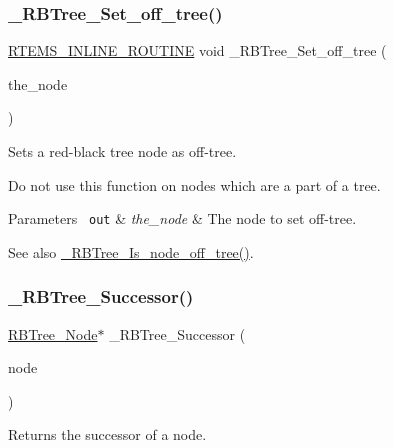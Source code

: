 \subsubsection{\texorpdfstring{\_RBTree\_Set\_off\_tree()}{\_RBTree\_Set\_off\_tree()}}
{\footnotesize\ttfamily \mbox{\hyperlink{group__RTEMSScoreBaseDefs_gac216239df231d5dbd15e3520b0b9313f}{R\+T\+E\+M\+S\+\_\+\+I\+N\+L\+I\+N\+E\+\_\+\+R\+O\+U\+T\+I\+NE}} void \+\_\+\+R\+B\+Tree\+\_\+\+Set\+\_\+off\+\_\+tree (\begin{DoxyParamCaption}\item[{\mbox{\hyperlink{structRBTree__Node}{R\+B\+Tree\+\_\+\+Node}} $\ast$}]{the\+\_\+node }\end{DoxyParamCaption})}



Sets a red-\/black tree node as off-\/tree. 

Do not use this function on nodes which are a part of a tree.


\begin{DoxyParams}[1]{Parameters}
\mbox{\texttt{ out}}  & {\em the\+\_\+node} & The node to set off-\/tree.\\
\hline
\end{DoxyParams}
\begin{DoxySeeAlso}{See also}
\mbox{\hyperlink{group__RTEMSScoreRBTree_ga4076722f9dbc78d8e6682b88a3ed0c8e}{\+\_\+\+R\+B\+Tree\+\_\+\+Is\+\_\+node\+\_\+off\+\_\+tree()}}. 
\end{DoxySeeAlso}
\mbox{\label{group__RTEMSScoreRBTree_ga0951acbbfbf23c8dc0eb4930f9516bf5}} 
\subsubsection{\texorpdfstring{\_RBTree\_Successor()}{\_RBTree\_Successor()}}
{\footnotesize\ttfamily \mbox{\hyperlink{structRBTree__Node}{R\+B\+Tree\+\_\+\+Node}}$\ast$ \+\_\+\+R\+B\+Tree\+\_\+\+Successor (\begin{DoxyParamCaption}\item[{const \mbox{\hyperlink{structRBTree__Node}{R\+B\+Tree\+\_\+\+Node}} $\ast$}]{node }\end{DoxyParamCaption})}



Returns the successor of a node. 


